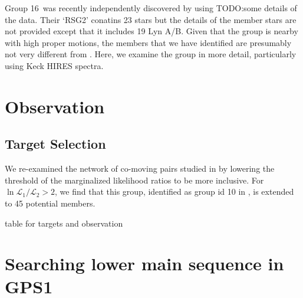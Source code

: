 \documentclass[modern,letterpaper]{aastex61}
\newcommand{\groupSixteen}{Group 16}
\newcommand{\todo}[1]{{\color{crimson}TODO:#1}}
\begin{document}
\groupSixteen\ was recently independently discovered by \citet{2016A&A...595A..22R}
using \todo{some details of the data}.
Their `RSG2' conatins 23 stars but the details of the member stars
are not provided except that it includes 19 Lyn A/B.
Given that the group is nearby with high proper motions, the members
that we have identified are presumably not very different from \citet{2016A&A...595A..22R}.
Here, we examine the group in more detail, particularly using
Keck HIRES spectra.


\section{Observation}
\label{sec:observation}

\subsection{Target Selection}
\label{sub:target_selection}

We re-examined the network of co-moving pairs studied in \citealt{2017AJ....153..257O} by
lowering the threshold of the marginalized likelihood ratios to be more inclusive.
For $\ln{\mathcal{L}_1}/{\mathcal{L}_2}>2$, we find that this group,
identified as group id 10 in \citealt{2017AJ....153..257O}, is extended to 45 potential members.

table for targets and observation




\section{Searching lower main sequence in GPS1}
\label{sec:searching_lower_main_sequence_in_gps1}


\end{document}

